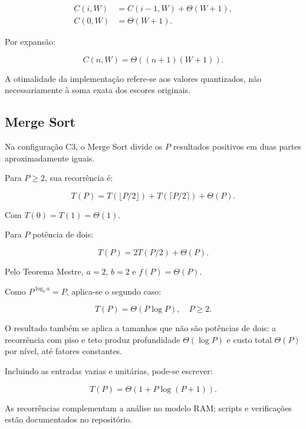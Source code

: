 \documentclass[11pt,a4paper]{article}
\theoremstyle{plain}
\theoremstyle{definition}
\theoremstyle{plain}
\begin{document}
\begin{equation}
\begin{aligned}
C(i,W)&=C(i-1,W)+\Theta(W+1),\\
C(0,W)&=\Theta(W+1).
\end{aligned}
\label{eq:recorrencia_custo_dp}
\end{equation}

Por expansão:

\begin{equation}
C(n,W)=\Theta((n+1)(W+1)).
\label{eq:solucao_recorrencia_custo_dp}
\end{equation}

A otimalidade da implementação
refere-se aos valores quantizados,
não necessariamente à soma
exata dos escores originais.

\subsection{Merge Sort}

Na configuração C3, o Merge Sort
divide os $P$ resultados positivos
em duas partes aproximadamente iguais.

Para $P\geq2$, sua recorrência é:

\begin{equation}
T(P)=T(\lfloor P/2\rfloor)
+T(\lceil P/2\rceil)+\Theta(P).
\label{eq:recorrencia_merge_av2}
\end{equation}

Com $T(0)=T(1)=\Theta(1)$.

Para $P$ potência de dois:

\[
T(P)=2T(P/2)+\Theta(P).
\]

Pelo Teorema Mestre,
$a=2$, $b=2$ e
$f(P)=\Theta(P)$.

Como $P^{\log_b a}=P$,
aplica-se o segundo caso:

\begin{equation}
T(P)=\Theta(P\log P),\quad P\geq2.
\label{eq:solucao_merge_av2}
\end{equation}

O resultado também se aplica
a tamanhos que não são potências
de dois: a recorrência com piso
e teto produz profundidade
$\Theta(\log P)$ e custo total
$\Theta(P)$ por nível,
até fatores constantes.

Incluindo as entradas vazias
e unitárias, pode-se escrever:

\[
T(P)=\Theta(1+P\log(P+1)).
\]

As recorrências complementam a análise no
modelo RAM; scripts e verificações estão
documentados no repositório.
\end{document}
